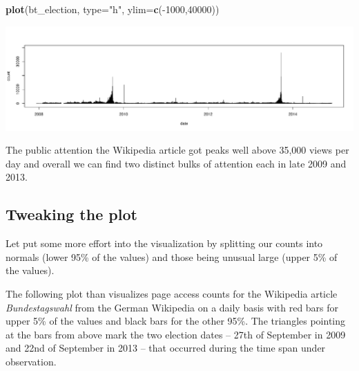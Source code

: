 \documentclass[]{article}
\newenvironment{Shaded}{\begin{snugshade}}{\end{snugshade}}
\newcommand{\KeywordTok}[1]{\textcolor[rgb]{0.13,0.29,0.53}{\textbf{{#1}}}}
\newcommand{\DataTypeTok}[1]{\textcolor[rgb]{0.13,0.29,0.53}{{#1}}}
\newcommand{\DecValTok}[1]{\textcolor[rgb]{0.00,0.00,0.81}{{#1}}}
\newcommand{\FloatTok}[1]{\textcolor[rgb]{0.00,0.00,0.81}{{#1}}}
\newcommand{\StringTok}[1]{\textcolor[rgb]{0.31,0.60,0.02}{{#1}}}
\newcommand{\NormalTok}[1]{{#1}}
\begin{document}
\begin{Shaded}
\begin{Highlighting}[]
\KeywordTok{plot}\NormalTok{(bt_election, }\DataTypeTok{type=}\StringTok{"h"}\NormalTok{, }\DataTypeTok{ylim=}\KeywordTok{c}\NormalTok{(-}\DecValTok{1000}\NormalTok{,}\DecValTok{40000}\NormalTok{))}
\end{Highlighting}
\end{Shaded}

\includegraphics{wikipediatrendblog_files/figure-latex/unnamed-chunk-4-1.pdf}

The public attention the Wikipedia article got peaks well above 35,000
views per day and overall we can find two distinct bulks of attention
each in late 2009 and 2013.

\subsection{Tweaking the plot}\label{tweaking-the-plot}

Let put some more effort into the visualization by splitting our counts
into normals (lower 95\% of the values) and those being unusual large
(upper 5\% of the values).

\begin{Shaded}
\end{Shaded}

The following plot than visualizes page access counts for the Wikipedia
article \emph{Bundestagswahl} from the German Wikipedia on a daily basis
with red bars for upper 5\% of the values and black bars for the other
95\%. The triangles pointing at the bars from above mark the two
election dates -- 27th of September in 2009 and 22nd of September in
2013 -- that occurred during the time span under observation.
\end{document}
